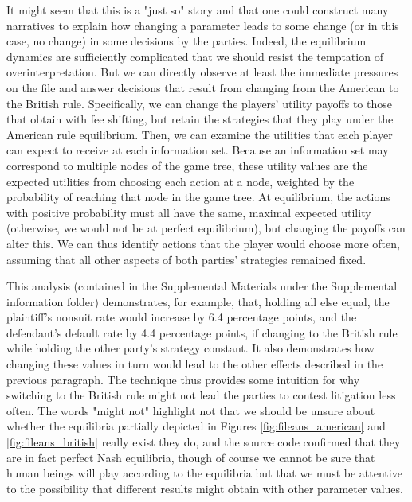 \documentclass{article}
\begin{document}
It might seem that this is a "just so" story and that one could construct many narratives to explain how changing a parameter leads to some change (or in this case, no change) in some decisions by the parties. Indeed, the equilibrium dynamics are sufficiently complicated that we should resist the temptation of overinterpretation. But  we can directly observe at least the immediate pressures on the file and answer decisions that result from changing from the American to the British rule. Specifically, we can change the players' utility payoffs to those that obtain with fee shifting, but retain the strategies that they play under the American rule equilibrium. Then, we can examine the utilities that each player can expect to receive at each information set. Because an information set may correspond to multiple nodes of the game tree, these utility values are the expected utilities from choosing each action at a node, weighted by the probability of reaching that node in the game tree. At equilibrium, the actions with positive probability must all have the same, maximal expected utility (otherwise, we would not be at perfect equilibrium), but changing the payoffs can alter this. We can thus identify actions that the player would choose more often, assuming that all other aspects of both parties' strategies remained fixed. 

This analysis (contained in the Supplemental Materials under the Supplemental information folder) demonstrates, for example, that, holding all else equal, the plaintiff's nonsuit rate would increase by 6.4 percentage points, and the defendant's default rate by 4.4 percentage points, if changing to the British rule while holding the other party's strategy constant. It also demonstrates how changing these values in turn would lead to the other effects described in the previous paragraph. The technique thus provides some intuition for why switching to the British rule might not lead the parties to contest litigation less often. The words "might not" highlight not that we should be unsure about whether the equilibria partially depicted in Figures \ref{fig:fileans_american} and \ref{fig:fileans_british} really exist \textemdash they do, and the source code confirmed that they are in fact perfect Nash equilibria, though of course we cannot be sure that human beings will play according to the equilibria \textemdash but that we must be attentive to the possibility that different results might obtain with other parameter values. 
\end{document}

